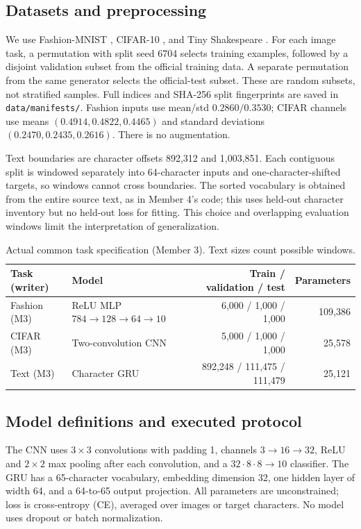 \subsection{Datasets and preprocessing}
We use Fashion-MNIST \citep{xiao2017fashion}, CIFAR-10 \citep{krizhevsky2009}, and
Tiny Shakespeare \citep{karpathychar}. For each image task, a permutation with split seed
6704 selects training examples, followed by a disjoint validation subset from the official
training data. A separate permutation from the same generator selects the official-test
subset. These are random subsets, not stratified samples. Full indices and SHA-256 split
fingerprints are saved in \texttt{data/manifests/}. Fashion inputs use mean/std
$0.2860/0.3530$; CIFAR channels use means $(0.4914,0.4822,0.4465)$ and standard deviations
$(0.2470,0.2435,0.2616)$. There is no augmentation.

Text boundaries are character offsets 892,312 and 1,003,851. Each contiguous split is
windowed separately into 64-character inputs and one-character-shifted targets, so windows
cannot cross boundaries. The sorted vocabulary is obtained from the entire source text,
as in Member 4's code; this uses held-out character inventory but no held-out loss for fitting.
This choice and overlapping evaluation windows limit the interpretation of generalization.

\begin{table}[H]\centering\small
\caption{Actual common task specification (Member 3). Text sizes count possible windows.}
\label{tab:data}
\begin{tabularx}{\linewidth}{lXrr}\toprule
Task (writer) & Model & Train / validation / test & Parameters\\\midrule
Fashion (M3) & ReLU MLP $784\to128\to64\to10$ & 6,000 / 1,000 / 1,000 & 109,386\\
CIFAR (M3) & Two-convolution CNN & 5,000 / 1,000 / 1,000 & 25,578\\
Text (M3) & Character GRU & 892,248 / 111,475 / 111,479 & 25,121\\
\bottomrule\end{tabularx}\end{table}

\subsection{Model definitions and executed protocol}
The CNN uses $3\times3$ convolutions with padding 1, channels $3\to16\to32$,
ReLU and $2\times2$ max pooling after each convolution, and a $32\cdot8\cdot8\to10$ classifier.
The GRU has a 65-character vocabulary, embedding dimension 32, one hidden layer of width 64,
and a 64-to-65 output projection. All parameters are unconstrained; loss is cross-entropy
(CE), averaged over images or target characters. No model uses dropout or batch normalization.

